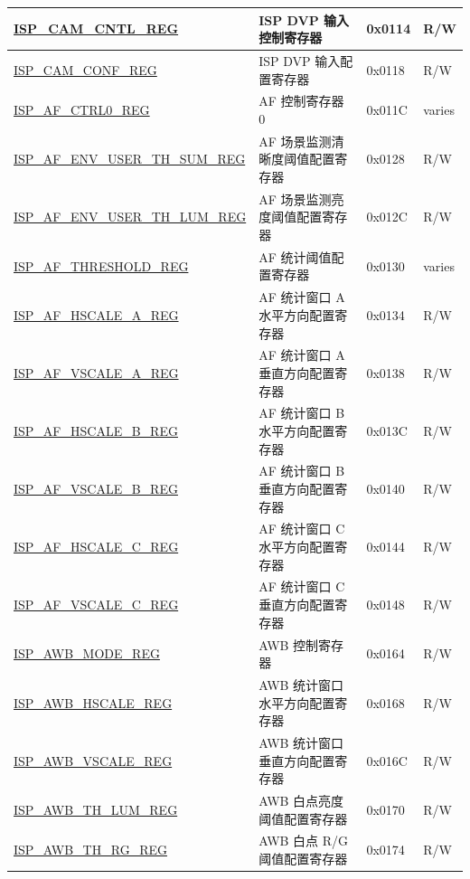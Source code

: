 \begin{longtable}{ | p{6cm} | p{7.2cm} | p{1.3cm} | p{1cm} | }
\hyperref[regdesc:ISPCAMCNTLREG]{ISP\_CAM\_CNTL\_REG} & ISP DVP 输入控制寄存器 & 0x0114 & R/W \\ \hline
\hyperref[regdesc:ISPCAMCONFREG]{ISP\_CAM\_CONF\_REG} & ISP DVP 输入配置寄存器 & 0x0118 & R/W \\ \hline
\hyperref[regdesc:ISPAFCTRL0REG]{ISP\_AF\_CTRL0\_REG} & AF 控制寄存器 0 & 0x011C & varies \\ \hline
\hyperref[regdesc:ISPAFENVUSERTHSUMREG]{ISP\_AF\_ENV\_USER\_TH\_SUM\_REG} & AF 场景监测清晰度阈值配置寄存器 & 0x0128 & R/W \\ \hline
\hyperref[regdesc:ISPAFENVUSERTHLUMREG]{ISP\_AF\_ENV\_USER\_TH\_LUM\_REG} & AF 场景监测亮度阈值配置寄存器 & 0x012C & R/W \\ \hline
\hyperref[regdesc:ISPAFTHRESHOLDREG]{ISP\_AF\_THRESHOLD\_REG} & AF 统计阈值配置寄存器 & 0x0130 & varies \\ \hline
\hyperref[regdesc:ISPAFHSCALEAREG]{ISP\_AF\_HSCALE\_A\_REG} & AF 统计窗口 A 水平方向配置寄存器 & 0x0134 & R/W \\ \hline
\hyperref[regdesc:ISPAFVSCALEAREG]{ISP\_AF\_VSCALE\_A\_REG} & AF 统计窗口 A 垂直方向配置寄存器 & 0x0138 & R/W \\ \hline
\hyperref[regdesc:ISPAFHSCALEBREG]{ISP\_AF\_HSCALE\_B\_REG} & AF 统计窗口 B 水平方向配置寄存器 & 0x013C & R/W \\ \hline
\hyperref[regdesc:ISPAFVSCALEBREG]{ISP\_AF\_VSCALE\_B\_REG} & AF 统计窗口 B 垂直方向配置寄存器 & 0x0140 & R/W \\ \hline
\hyperref[regdesc:ISPAFHSCALECREG]{ISP\_AF\_HSCALE\_C\_REG} & AF 统计窗口 C 水平方向配置寄存器 & 0x0144 & R/W \\ \hline
\hyperref[regdesc:ISPAFVSCALECREG]{ISP\_AF\_VSCALE\_C\_REG} & AF 统计窗口 C 垂直方向配置寄存器 & 0x0148 & R/W \\ \hline
\hyperref[regdesc:ISPAWBMODEREG]{ISP\_AWB\_MODE\_REG} & AWB 控制寄存器 & 0x0164 & R/W \\ \hline
\hyperref[regdesc:ISPAWBHSCALEREG]{ISP\_AWB\_HSCALE\_REG} & AWB 统计窗口水平方向配置寄存器 & 0x0168 & R/W \\ \hline
\hyperref[regdesc:ISPAWBVSCALEREG]{ISP\_AWB\_VSCALE\_REG} & AWB 统计窗口垂直方向配置寄存器 & 0x016C & R/W \\ \hline
\hyperref[regdesc:ISPAWBTHLUMREG]{ISP\_AWB\_TH\_LUM\_REG} & AWB 白点亮度阈值配置寄存器 & 0x0170 & R/W \\ \hline
\hyperref[regdesc:ISPAWBTHRGREG]{ISP\_AWB\_TH\_RG\_REG} & AWB 白点 R/G 阈值配置寄存器 & 0x0174 & R/W \\ \hline

\end{longtable}
